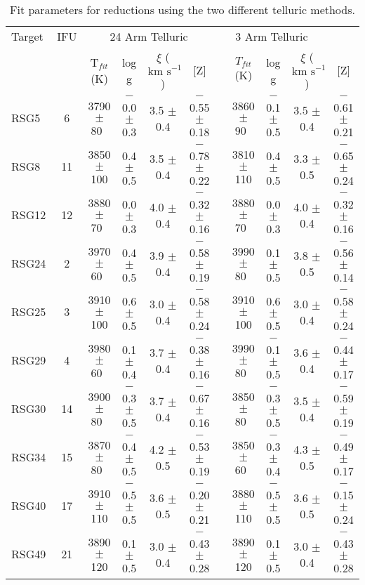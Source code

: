 \documentclass[iop]{emulateapj}
\def\kms{$\mbox{km s}^{-1}$}
\def\pp{$\phantom{-}$}
\def\o{$\phantom{0}$}
\begin{document}
\begin{table*}
\begin{center}
\caption{
Fit parameters for reductions using the two different telluric methods.
\label{tb:stellar-params}
         }
\scriptsize
\begin{tabular}{lc cccc c cccc}
 \hline
 \hline
  Target  & IFU &  \multicolumn{4}{c}{24 Arm Telluric} & \multicolumn{4}{c}{3 Arm Telluric}\\
  \cline{3-6}  \cline{8-11}
 &  & T$_{fit}$ (K) & log g & $\xi$ (\kms) & [Z] & & $T_{fit}$ (K) & log g & $\xi$ (\kms) & [Z]\\
  \hline
RSG5  & 6 & 3790 $\pm$ 80\o & $-$0.0 $\pm$ 0.3 & 3.5 $\pm$ 0.4 & $-$0.55 $\pm$ 0.18 & & 3860 $\pm$ 90\o & $-$0.1 $\pm$ 0.5 &  3.5 $\pm$ 0.4 & $-$0.61 $\pm$ 0.21 \\
RSG8  & 11& 3850 $\pm$ 100  & \pp0.4 $\pm$ 0.5 & 3.5 $\pm$ 0.4 & $-$0.78 $\pm$ 0.22 & & 3810 $\pm$ 110  & \pp0.4 $\pm$ 0.5 &  3.3 $\pm$ 0.5 & $-$0.65 $\pm$ 0.24 \\
RSG12 & 12& 3880 $\pm$ 70\o & \pp0.0 $\pm$ 0.3 & 4.0 $\pm$ 0.4 & $-$0.32 $\pm$ 0.16 & & 3880 $\pm$ 70\o & \pp0.0 $\pm$ 0.3 &  4.0 $\pm$ 0.4 & $-$0.32 $\pm$ 0.16 \\
RSG24 & 2 & 3970 $\pm$ 60\o & \pp0.4 $\pm$ 0.5 & 3.9 $\pm$ 0.4 & $-$0.58 $\pm$ 0.19 & & 3990 $\pm$ 80\o & \pp0.1 $\pm$ 0.5 &  3.8 $\pm$ 0.5 & $-$0.56 $\pm$ 0.14 \\
RSG25 & 3 & 3910 $\pm$ 100  & \pp0.6 $\pm$ 0.5 & 3.0 $\pm$ 0.4 & $-$0.58 $\pm$ 0.24 & & 3910 $\pm$ 100  & \pp0.6 $\pm$ 0.5 &  3.0 $\pm$ 0.4 & $-$0.58 $\pm$ 0.24 \\
RSG29 & 4 & 3980 $\pm$ 60\o & \pp0.1 $\pm$ 0.4 & 3.7 $\pm$ 0.4 & $-$0.38 $\pm$ 0.16 & & 3990 $\pm$ 80\o & $-$0.1 $\pm$ 0.5 &  3.6 $\pm$ 0.4 & $-$0.44 $\pm$ 0.17 \\
RSG30 & 14& 3900 $\pm$ 80\o & $-$0.3 $\pm$ 0.5 & 3.7 $\pm$ 0.4 & $-$0.67 $\pm$ 0.16 & & 3850 $\pm$ 80\o & $-$0.3 $\pm$ 0.5 &  3.5 $\pm$ 0.4 & $-$0.59 $\pm$ 0.19 \\
RSG34 & 15& 3870 $\pm$ 80\o & $-$0.4 $\pm$ 0.5 & 4.2 $\pm$ 0.5 & $-$0.53 $\pm$ 0.19 & & 3850 $\pm$ 60\o & $-$0.3 $\pm$ 0.4 &  4.3 $\pm$ 0.5 & $-$0.49 $\pm$ 0.17 \\
RSG40 & 17& 3910 $\pm$ 110  & $-$0.5 $\pm$ 0.5 & 3.6 $\pm$ 0.5 & $-$0.20 $\pm$ 0.21 & & 3880 $\pm$ 110  & $-$0.5 $\pm$ 0.5 &  3.6 $\pm$ 0.5 & $-$0.15 $\pm$ 0.24 \\
RSG49 & 21& 3890 $\pm$ 120  & \pp0.1 $\pm$ 0.5 & 3.0 $\pm$ 0.4 & $-$0.43 $\pm$ 0.28 & & 3890 $\pm$ 120  & \pp0.1 $\pm$ 0.5 &  3.0 $\pm$ 0.4 & $-$0.43 $\pm$ 0.28 \\

\end{tabular}
\end{center}
\end{table*}
\end{document}
